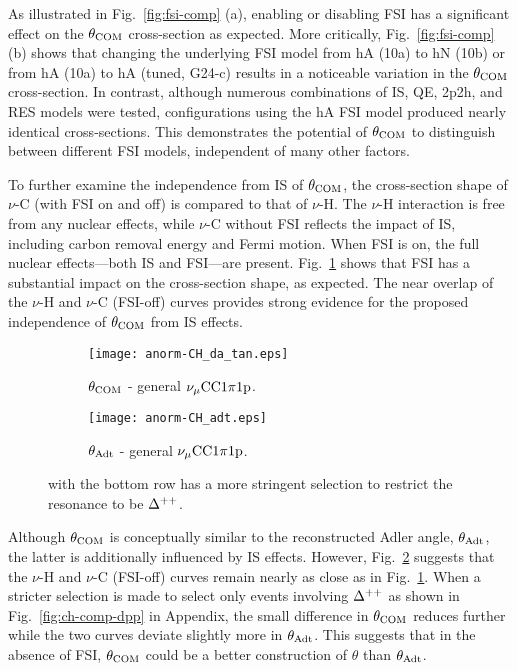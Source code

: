 As illustrated in Fig.~\ref{fig:fsi-comp} (a), enabling or disabling FSI has a significant effect on the $\theta_{\textrm{COM}}$ cross-section as expected.
More critically, Fig.~\ref{fig:fsi-comp} (b) shows that changing the underlying FSI model from hA (10a) to hN (10b) or from hA (10a) to hA (tuned, G24-c) results in a noticeable variation in the $\theta_{\textrm{COM}}$ cross-section. 
In contrast, although numerous combinations of IS, QE, 2p2h, and RES models were tested, configurations using the hA FSI model produced nearly identical cross-sections.
This demonstrates the potential of $\theta_{\textrm{COM}}$ to distinguish between different FSI models, independent of many other factors.


To further examine the independence from IS of $\theta_{\textrm{COM}}$, the cross-section shape of $\nu$-C (with FSI on and off) is compared to that of $\nu$-H. 
The $\nu$-H interaction is free from any nuclear effects, while $\nu$-C without FSI reflects the impact of IS, including carbon removal energy and Fermi motion. 
When FSI is on, the full nuclear effects—both IS and FSI—are present. 
Fig.~\ref{subfig:ch-comp-com-cc1pi1p} shows that FSI has a substantial impact on the cross-section shape, as expected. 
The near overlap of the $\nu$-H and $\nu$-C (FSI-off) curves provides strong evidence for the proposed independence of $\theta_{\textrm{COM}}$ from IS effects.

\begin{figure}
    \centering
    \begin{subfigure}[ht!]{\scfigwid\textwidth}
        \centering
        \texttt{[image: anorm-CH\_da\_tan.eps]}     
        \caption{$\theta_{\textrm{COM}}$ - general $\nu_{\mu}\textrm{CC}1\pi1\textrm{p}$.}
        \label{subfig:ch-comp-com-cc1pi1p}
    \end{subfigure}
    \begin{subfigure}[ht!]{\scfigwid\textwidth}
        \centering
        \texttt{[image: anorm-CH\_adt.eps]}        
        \caption{$\theta_{\textrm{Adt}}$ - general $\nu_{\mu}\textrm{CC}1\pi1\textrm{p}$.}
        \label{subfig:ch-comp-adt-cc1pi1p}
    \end{subfigure} 
    \caption{  with the bottom row has a more stringent selection to restrict the resonance to be $\Delta^{++}$.}
    \label{fig:ch-comp}
\end{figure}

Although $\theta_{\textrm{COM}}$ is conceptually similar to the reconstructed Adler angle, $\theta_{\textrm{Adt}}$, the latter is additionally influenced by IS effects. 
However, Fig.~\ref{subfig:ch-comp-adt-cc1pi1p}  suggests that the $\nu$-H and $\nu$-C (FSI-off) curves remain nearly as close as in Fig.~\ref{subfig:ch-comp-com-cc1pi1p}. 
When a stricter selection is made to select only events involving $\Delta^{++}$ as shown in Fig.~\ref{fig:ch-comp-dpp} in Appendix, the small difference in $\theta_{\textrm{COM}}$ reduces further while the two curves deviate slightly more in $\theta_{\textrm{Adt}}$. 
This suggests that in the absence of FSI, $\theta_{\textrm{COM}}$ could be a better construction of $\theta$ than $\theta_{\textrm{Adt}}$. 

